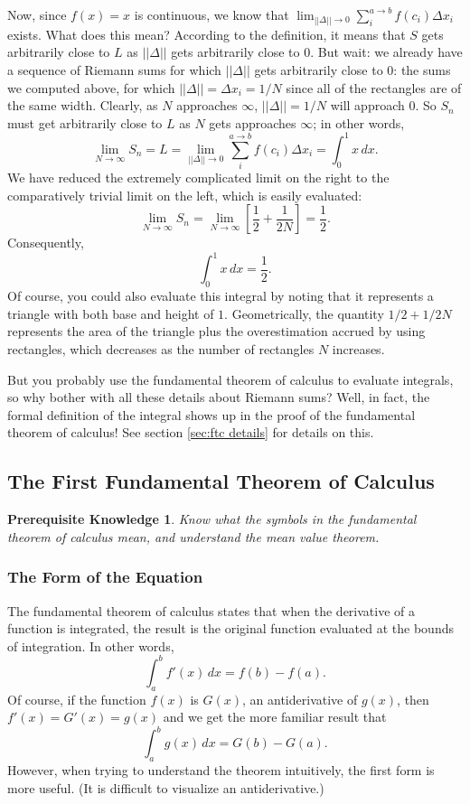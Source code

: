 \documentclass{myarticle}
\theoremstyle{nospace}
\newtheorem*{oldprereq}{Prerequisite Knowledge}
\newenvironment{prereq}{\begin{mdframed}\begin{oldprereq}}{\end{oldprereq}\end{mdframed}}
\newtheorem{old series theorem}{Theorem}
\newenvironment{series theorem}{\begin{mdframed}\begin{old series theorem}}{\end{old series theorem}\end{mdframed}}
\begin{document}
Now, since $f(x) = x$ is continuous, we know that $\lim_{||\Delta|| \to 0} \sum_i^{a \to b} f(c_i) \Delta x_i$ exists. What does this mean? According to the definition, it means that $S$ gets arbitrarily close to $L$ as $||\Delta||$ gets arbitrarily close to $0$. But wait: we already have a sequence of Riemann sums for which $||\Delta||$ gets arbitrarily close to $0$: the sums we computed above, for which $||\Delta|| = \Delta x_i = 1/N$ since all of the rectangles are of the same width. Clearly, as $N$ approaches $\infty$, $||\Delta|| = 1/N$ will approach $0$. So $S_n$ must get arbitrarily close to $L$ as $N$ gets approaches $\infty$; in other words, \[ \lim_{N \to \infty} S_n = L = \lim_{||\Delta|| \to 0} \sum_i^{a \to b} f(c_i) \Delta x_i = \int_0^1 x \,dx. \] We have reduced the extremely complicated limit on the right to the comparatively trivial limit on the left, which is easily evaluated: \[ \lim_{N \to \infty} S_n = \lim_{N \to \infty} \left[\frac{1}{2} + \frac{1}{2N}\right] = \frac{1}{2}. \] Consequently, \[ \int_0^1 x \,dx = \frac{1}{2}. \] Of course, you could also evaluate this integral by noting that it represents a triangle with both base and height of $1$. Geometrically, the quantity $1/2 + 1/2N$ represents the area of the triangle plus the overestimation accrued by using rectangles, which decreases as the number of rectangles $N$ increases.

But you probably use the fundamental theorem of calculus to evaluate integrals, so why bother with all these details about Riemann sums? Well, in fact, the formal definition of the integral shows up in the proof of the fundamental theorem of calculus! See section \ref{sec:ftc details} for details on this.

\subsection{The First Fundamental Theorem of Calculus} \label{sec:ftc}
\begin{prereq} Know what the symbols in the fundamental theorem of calculus mean, and understand the mean value theorem. \end{prereq}

\subsubsection{The Form of the Equation} \label{sec:ftc equation}
The fundamental theorem of calculus states that when the derivative of a function is integrated, the result is the original function evaluated at the bounds of integration. In other words, \[ \int_a^b f'(x) \,dx = f(b) - f(a). \] Of course, if the function $f(x)$ is $G(x)$, an antiderivative of $g(x)$, then $f'(x) = G'(x) = g(x)$ and we get the more familiar result that \[ \int_a^b g(x) \,dx = G(b) - G(a). \] However, when trying to understand the theorem intuitively, the first form is more useful. (It is difficult to visualize an antiderivative.)
\end{document}

